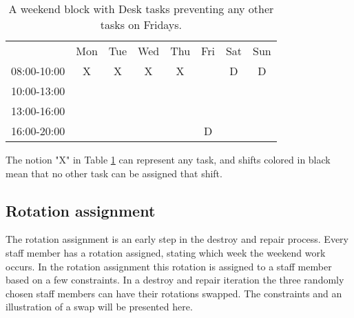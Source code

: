\begin{table}[!h]
\centering
\caption{A weekend block with Desk tasks preventing any other tasks on Fridays.}
\label{Friday_percolation}
\begin{tabular}{cccccccc}
                                 & Mon                    & Tue                    & Wed                    & Thu                    & Fri                                            & Sat                                            & Sun                                            \\ \cline{2-8} 
\multicolumn{1}{c|}{08:00-10:00} & \multicolumn{1}{c|}{X} & \multicolumn{1}{c|}{X} & \multicolumn{1}{c|}{X} & \multicolumn{1}{c|}{X} & \multicolumn{1}{c|}{\cellcolor[HTML]{000000}}  & \multicolumn{1}{c|}{\cellcolor[HTML]{FCFF2F}D} & \multicolumn{1}{c|}{\cellcolor[HTML]{FCFF2F}D} \\ \cline{2-8} 
\multicolumn{1}{c|}{10:00-13:00} & \multicolumn{1}{c|}{}  & \multicolumn{1}{c|}{}  & \multicolumn{1}{c|}{}  & \multicolumn{1}{c|}{}  & \multicolumn{1}{c|}{\cellcolor[HTML]{000000}}  &                                                &                                                \\ \cline{2-6}
\multicolumn{1}{c|}{13:00-16:00} & \multicolumn{1}{c|}{}  & \multicolumn{1}{c|}{}  & \multicolumn{1}{c|}{}  & \multicolumn{1}{c|}{}  & \multicolumn{1}{c|}{\cellcolor[HTML]{000000}}  &                                                &                                                \\ \cline{2-6}
\multicolumn{1}{c|}{16:00-20:00} & \multicolumn{1}{c|}{}  & \multicolumn{1}{c|}{}  & \multicolumn{1}{c|}{}  & \multicolumn{1}{c|}{}  & \multicolumn{1}{c|}{\cellcolor[HTML]{FCFF2F}D} &                                                &                                                \\ \cline{2-6}
\end{tabular}
\end{table}

 The notion "X" in Table \ref{Friday_percolation} can represent any task, and shifts colored in black mean that no other task can be assigned that shift.

\subsection{Rotation assignment} \label{rotation}
The rotation assignment is an early step in the destroy and repair process. Every staff member has a rotation assigned, stating which week the weekend work occurs. In the rotation assignment this rotation is assigned to a staff member based on a few constraints. In a destroy and repair iteration the three randomly chosen staff members can have their rotations swapped. The constraints and an illustration of a swap will be presented here.

